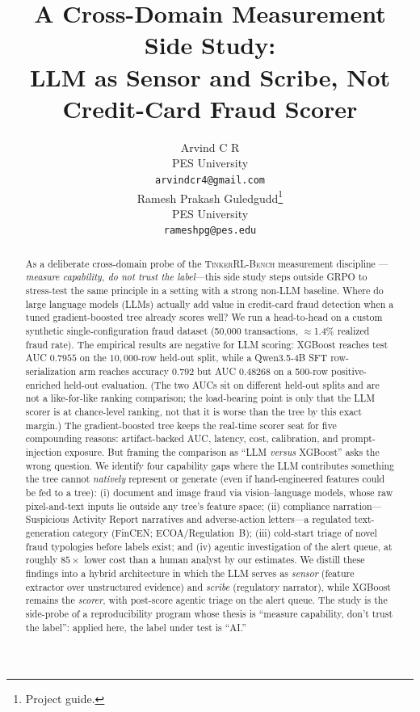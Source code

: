 \documentclass{article}
\title{A Cross-Domain Measurement Side Study:\\
       LLM as Sensor and Scribe, Not Credit-Card Fraud Scorer}
\author{
  Arvind C R \\
  PES University\\
  \texttt{arvindcr4@gmail.com} \\
  \And
  Ramesh Prakash Guledgudd\thanks{Project guide.} \\
  PES University\\
  \texttt{rameshpg@pes.edu} \\
}
\newcommand{\ours}{\textsc{TinkerRL-Bench}}
\begin{document}
\sloppy {}  \hfuzz=2pt
\maketitle
\begin{abstract}
As a deliberate cross-domain probe of the \ours{} measurement discipline
---\emph{measure capability, do not trust the label}---this side study steps
outside GRPO to stress-test the same principle in a setting with a strong
non-LLM baseline. Where do large language models (LLMs) actually add value in
credit-card fraud detection when a tuned gradient-boosted tree already scores well? We run a
head-to-head on a custom synthetic single-configuration fraud dataset (50{,}000
transactions, $\approx$1.4\% realized fraud rate). The empirical results are negative for LLM scoring:
XGBoost reaches test AUC $0.7955$ on the $10{,}000$-row held-out split, while
a Qwen3.5-4B SFT row-serialization arm reaches accuracy $0.792$ but AUC
$0.48268$ on a 500-row positive-enriched held-out evaluation. (The two AUCs sit on
different held-out splits and are not a like-for-like ranking comparison; the
load-bearing point is only that the LLM scorer is at chance-level ranking, not that
it is worse than the tree by this exact margin.) The gradient-boosted tree keeps the real-time scorer seat for five compounding reasons:
artifact-backed AUC, latency, cost, calibration, and prompt-injection exposure.
But framing the comparison as
``LLM \emph{versus} XGBoost'' asks the wrong question. We identify four
capability gaps where the LLM contributes something the tree cannot \emph{natively}
represent or generate (even if hand-engineered features could be fed to a tree):
(i) document and image fraud via vision--language models, whose
raw pixel-and-text inputs lie outside any tree's feature space; (ii) compliance
narration---Suspicious Activity Report narratives and adverse-action
letters---a regulated text-generation category (FinCEN; ECOA/Regulation~B);
(iii) cold-start triage of novel fraud typologies before labels exist; and
(iv) agentic investigation of the alert queue, at roughly $85\times$ lower cost
than a human analyst by our estimates. We distill these findings into a
hybrid architecture in which the LLM serves as \emph{sensor} (feature extractor
over unstructured evidence) and \emph{scribe} (regulatory narrator), while
XGBoost remains the \emph{scorer}, with post-score agentic triage on the alert
queue. The study is the side-probe of a reproducibility program whose thesis is
``measure capability, don't trust the label'': applied here, the label under
test is ``AI.''
\end{abstract}
\end{document}
